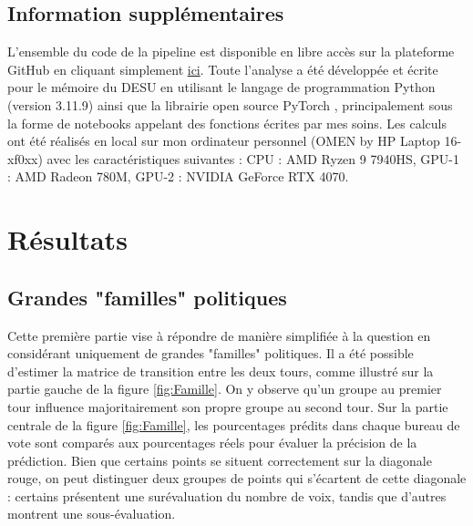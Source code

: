 \documentclass[11pt]{article}
\begin{document}
        \subsection*{Information supplémentaires}
            L'ensemble du code de la pipeline est disponible en libre accès sur la plateforme GitHub en cliquant simplement \href{https://github.com/alexandre-laine/Pipeline_Elections_Legislatives}{ici}. Toute l'analyse a été développée et écrite pour le mémoire du DESU en utilisant le langage de programmation Python (version 3.11.9) ainsi que la librairie open source PyTorch \cite{Ansel_Yang_He_Gimelshein_Jain_Voznesensky_Bao_Bell_Berard_Burovski_et_al._2024}, principalement sous la forme de notebooks appelant des fonctions écrites par mes soins. Les calculs ont été réalisés en local sur mon ordinateur personnel (OMEN by HP Laptop 16-xf0xx) avec les caractéristiques suivantes : CPU : AMD Ryzen 9 7940HS, GPU-1 : AMD Radeon 780M, GPU-2 : NVIDIA GeForce RTX 4070.

    \newpage
    \section{Résultats}
        
        \subsection*{Grandes "familles" politiques}
            
        Cette première partie vise à répondre de manière simplifiée à la question en considérant uniquement de grandes "familles" politiques. Il a été possible d'estimer la matrice de transition entre les deux tours, comme illustré sur la partie gauche de la figure \ref{fig:Famille}. On y observe qu'un groupe au premier tour influence majoritairement son propre groupe au second tour. Sur la partie centrale de la figure \ref{fig:Famille}, les pourcentages prédits dans chaque bureau de vote sont comparés aux pourcentages réels pour évaluer la précision de la prédiction. Bien que certains points se situent correctement sur la diagonale rouge, on peut distinguer deux groupes de points qui s'écartent de cette diagonale : certains présentent une surévaluation du nombre de voix, tandis que d'autres montrent une sous-évaluation.
            
\end{document}
